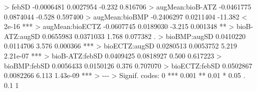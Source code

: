 \documentclass[
  letterpaper,
]{book}
\newenvironment{Shaded}{\begin{snugshade}}{\end{snugshade}}
\newcommand{\DecValTok}[1]{\textcolor[rgb]{0.68,0.00,0.00}{#1}}
\newcommand{\ErrorTok}[1]{\textcolor[rgb]{0.68,0.00,0.00}{#1}}
\newcommand{\FloatTok}[1]{\textcolor[rgb]{0.68,0.00,0.00}{#1}}
\newcommand{\NormalTok}[1]{\textcolor[rgb]{0.00,0.23,0.31}{#1}}
\newcommand{\SpecialCharTok}[1]{\textcolor[rgb]{0.37,0.37,0.37}{#1}}
\newcommand{\StringTok}[1]{\textcolor[rgb]{0.13,0.47,0.30}{#1}}
\begin{document}
\begin{Shaded}
\begin{Highlighting}[]
\SpecialCharTok{\textgreater{}}\NormalTok{ febSD            }\SpecialCharTok{{-}}\FloatTok{0.0006481}  \FloatTok{0.0027954}  \SpecialCharTok{{-}}\FloatTok{0.232} \FloatTok{0.816706}    
\SpecialCharTok{\textgreater{}}\NormalTok{ augMean}\SpecialCharTok{:}\NormalTok{bioB}\SpecialCharTok{{-}}\NormalTok{ATZ }\SpecialCharTok{{-}}\FloatTok{0.0461775}  \FloatTok{0.0874044}  \SpecialCharTok{{-}}\FloatTok{0.528} \FloatTok{0.597400}    
\SpecialCharTok{\textgreater{}}\NormalTok{ augMean}\SpecialCharTok{:}\NormalTok{bioBMP   }\SpecialCharTok{{-}}\FloatTok{0.2406297}  \FloatTok{0.0211404} \SpecialCharTok{{-}}\FloatTok{11.382}  \SpecialCharTok{\textless{}} \FloatTok{2e{-}16} \SpecialCharTok{**}\ErrorTok{*}
\ErrorTok{\textgreater{}}\NormalTok{ augMean}\SpecialCharTok{:}\NormalTok{bioECTZ  }\SpecialCharTok{{-}}\FloatTok{0.0607745}  \FloatTok{0.0189030}  \SpecialCharTok{{-}}\FloatTok{3.215} \FloatTok{0.001348} \SpecialCharTok{**} 
\ErrorTok{\textgreater{}}\NormalTok{ bioB}\SpecialCharTok{{-}}\NormalTok{ATZ}\SpecialCharTok{:}\NormalTok{augSD    }\FloatTok{0.0655983}  \FloatTok{0.0371033}   \FloatTok{1.768} \FloatTok{0.077382}\NormalTok{ .  }
\SpecialCharTok{\textgreater{}}\NormalTok{ bioBMP}\SpecialCharTok{:}\NormalTok{augSD      }\FloatTok{0.0410220}  \FloatTok{0.0114706}   \FloatTok{3.576} \FloatTok{0.000366} \SpecialCharTok{**}\ErrorTok{*}
\ErrorTok{\textgreater{}}\NormalTok{ bioECTZ}\SpecialCharTok{:}\NormalTok{augSD     }\FloatTok{0.0280513}  \FloatTok{0.0053752}   \FloatTok{5.219} \FloatTok{2.21e{-}07} \SpecialCharTok{**}\ErrorTok{*}
\ErrorTok{\textgreater{}}\NormalTok{ bioB}\SpecialCharTok{{-}}\NormalTok{ATZ}\SpecialCharTok{:}\NormalTok{febSD    }\FloatTok{0.0409425}  \FloatTok{0.0818927}   \FloatTok{0.500} \FloatTok{0.617223}    
\SpecialCharTok{\textgreater{}}\NormalTok{ bioBMP}\SpecialCharTok{:}\NormalTok{febSD      }\FloatTok{0.0056433}  \FloatTok{0.0150126}   \FloatTok{0.376} \FloatTok{0.707070}    
\SpecialCharTok{\textgreater{}}\NormalTok{ bioECTZ}\SpecialCharTok{:}\NormalTok{febSD     }\FloatTok{0.0502867}  \FloatTok{0.0082266}   \FloatTok{6.113} \FloatTok{1.43e{-}09} \SpecialCharTok{**}\ErrorTok{*}
\ErrorTok{\textgreater{}} \SpecialCharTok{{-}{-}{-}}
\ErrorTok{\textgreater{}}\NormalTok{ Signif. codes}\SpecialCharTok{:}  \DecValTok{0} \StringTok{\textquotesingle{}***\textquotesingle{}} \FloatTok{0.001} \StringTok{\textquotesingle{}**\textquotesingle{}} \FloatTok{0.01} \StringTok{\textquotesingle{}*\textquotesingle{}} \FloatTok{0.05} \StringTok{\textquotesingle{}.\textquotesingle{}} \FloatTok{0.1} \StringTok{\textquotesingle{} \textquotesingle{}} \DecValTok{1}

\end{Highlighting}
\end{Shaded}
\end{document}
